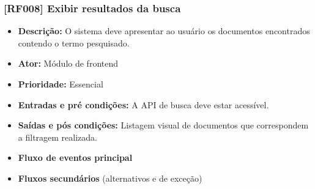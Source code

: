  \subsubsection{[RF008] Exibir resultados da busca}
\begin{itemize}
   \item \textbf{Descrição:} O sistema deve apresentar ao usuário os documentos encontrados contendo o termo pesquisado.
   \item \textbf{Ator:} Módulo de frontend
   \item \textbf{Prioridade:} Essencial
   \item \textbf{Entradas e pré condições:} A API de busca deve estar acessível.
   \item \textbf{Saídas e pós condições:} Listagem visual de documentos que correspondem a filtragem realizada.
   \item \textbf{Fluxo de eventos principal}
   \item \textbf{Fluxos secundários} (alternativos e de exceção)
 \end{itemize}

